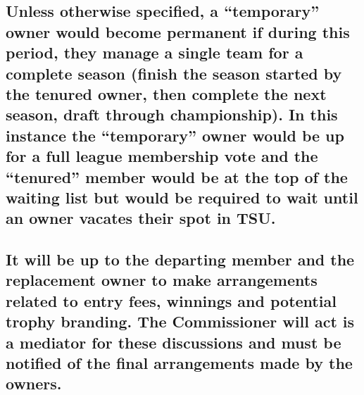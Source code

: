 \documentclass[
]{book}
\begin{document}
\hypertarget{unless-otherwise-specified-a-temporary-owner-would-become-permanent-if-during-this-period-they-manage-a-single-team-for-a-complete-season-finish-the-season-started-by-the-tenured-owner-then-complete-the-next-season-draft-through-championship.-in-this-instance-the-temporary-owner-would-be-up-for-a-full-league-membership-vote-and-the-tenured-member-would-be-at-the-top-of-the-waiting-list-but-would-be-required-to-wait-until-an-owner-vacates-their-spot-in-tsu.}{%
\subsection{Unless otherwise specified, a ``temporary'' owner would become permanent if during this period, they manage a single team for a complete season (finish the season started by the tenured owner, then complete the next season, draft through championship). In this instance the ``temporary'' owner would be up for a full league membership vote and the ``tenured'' member would be at the top of the waiting list but would be required to wait until an owner vacates their spot in TSU.}\label{unless-otherwise-specified-a-temporary-owner-would-become-permanent-if-during-this-period-they-manage-a-single-team-for-a-complete-season-finish-the-season-started-by-the-tenured-owner-then-complete-the-next-season-draft-through-championship.-in-this-instance-the-temporary-owner-would-be-up-for-a-full-league-membership-vote-and-the-tenured-member-would-be-at-the-top-of-the-waiting-list-but-would-be-required-to-wait-until-an-owner-vacates-their-spot-in-tsu.}}

\hypertarget{it-will-be-up-to-the-departing-member-and-the-replacement-owner-to-make-arrangements-related-to-entry-fees-winnings-and-potential-trophy-branding.-the-commissioner-will-act-is-a-mediator-for-these-discussions-and-must-be-notified-of-the-final-arrangements-made-by-the-owners.}{%
\subsection{It will be up to the departing member and the replacement owner to make arrangements related to entry fees, winnings and potential trophy branding. The Commissioner will act is a mediator for these discussions and must be notified of the final arrangements made by the owners.}\label{it-will-be-up-to-the-departing-member-and-the-replacement-owner-to-make-arrangements-related-to-entry-fees-winnings-and-potential-trophy-branding.-the-commissioner-will-act-is-a-mediator-for-these-discussions-and-must-be-notified-of-the-final-arrangements-made-by-the-owners.}}
\end{document}
